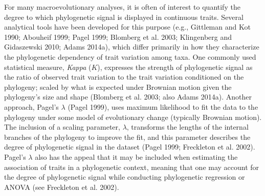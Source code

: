 \documentclass[
]{article}
\begin{document}
For many macroevolutionary analyses, it is often of interest to quantify
the degree to which phylogenetic signal is displayed in continuous
traits. Several analytical tools have been developed for this purpose
(e.g., Gittleman and Kot 1990; Abouheif 1999; Pagel 1999; Blomberg et
al. 2003; Klingenberg and Gidaszewski 2010; Adams 2014a), which differ
primarily in how they characterize the phylogenetic dependency of trait
variation among taxa. One commonly used statistical measure,
\emph{Kappa} (\(K\)), expresses the strength of phylogenetic signal as
the ratio of observed trait variation to the trait variation conditioned
on the phylogeny; scaled by what is expected under Brownian motion given
the phylogeny's size and shape (Blomberg et al. 2003; also Adams 2014a).
Another approach, Pagel's \(\lambda\) (Pagel 1999), uses maximum
likelihood to fit the data to the phylogeny under some model of
evolutionary change (typically Brownian motion). The inclusion of a
scaling parameter, \(\lambda\), transforms the lengths of the internal
branches of the phylogeny to improve the fit, and this parameter
describes the degree of phylogenetic signal in the dataset (Pagel 1999;
Freckleton et al. 2002). Pagel's \(\lambda\) also has the appeal that it
may be included when estimating the association of traits in a
phylogenetic context, meaning that one may account for the degree of
phylogenetic signal while conducting phylogenetic regression or ANOVA
(see Freckleton et al. 2002). \hfill\break
\end{document}
